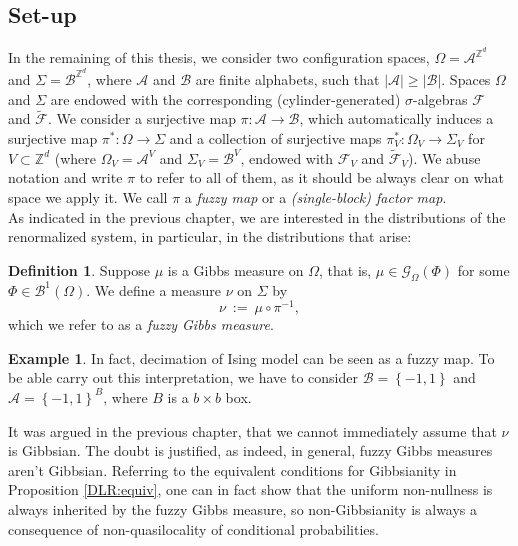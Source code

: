 \documentclass[12pt]{article}
\newcommand{\A}{\mathcal{A}}
\newcommand{\B}{\mathcal{B}}
\newcommand{\BB}{\mathscr{B}}
\newcommand{\F}{\mathcal{F}}
\newcommand{\G}{\mathcal{G}}
\newcommand{\Z}{\mathbb{Z}}
\newcommand{\set}[1]{\left\{#1\right\}}
\newcommand{\ra}{\rightarrow}
\newcommand{\1}{\mathbbm{1}}
\newcommand{\5}{\vspace{0.5cm}}
\renewcommand{\tilde}{\widetilde}
\theoremstyle{definition}
\newtheorem{ex}[thm]{Example}
\newtheorem{df}[thm]{Definition}
\begin{document}

\subsection{Set-up}

In the remaining of this thesis, we consider two configuration spaces, $\Omega=\A^{\Z^d}$ and $\Sigma=\B^{\Z^d}$, where $\A$ and $\B$ are finite alphabets, such that $|\A|\geq|\B|$. Spaces $\Omega$ and $\Sigma$ are endowed with the corresponding (cylinder-generated) $\sigma$-algebras $\F$ and $\tilde{\F}$. We consider a surjective map $\pi:\A\ra\B$, which automatically induces a surjective map $\pi^*:\Omega\ra\Sigma$ and a collection of surjective maps $\pi_V^*:\Omega_V\ra\Sigma_V$ for $V\subset\Z^d$ (where $\Omega_V=\A^V$ and $\Sigma_V=\B^V$, endowed with $\F_V$ and $\tilde{\F}_V$). We abuse notation and write $\pi$ to refer to all of them, as it should be always clear on what space we apply it. We call $\pi$ a \textit{fuzzy map} or a \textit{(single-block) factor map}.  \\

As indicated in the previous chapter, we are interested in the distributions of the renormalized system, in particular, in the distributions that arise:
\begin{df}
Suppose $\mu$ is a Gibbs measure on $\Omega$, that is, $\mu\in\G_\Omega(\Phi)$ for some $\Phi\in\BB^1(\Omega)$. We define a measure $\nu$ on $\Sigma$ by
$$\nu ~:=~ \mu \circ \pi^{-1},$$
which we refer to as a \textit{fuzzy Gibbs measure}.
\end{df}
\begin{ex}
In fact, decimation of Ising model can be seen as a fuzzy map. To be able carry out this interpretation, we have to consider $\B=\set{-1,1}$ and $\A=\set{-1,1}^{B}$, where $B$ is a $b\times b$ box.
\end{ex}
It was argued in the previous chapter, that we cannot immediately assume that $\nu$ is Gibbsian. The doubt is justified, as indeed, in general, fuzzy Gibbs measures aren't Gibbsian. Referring to the equivalent conditions for Gibbsianity in Proposition \ref{DLR:equiv}, one can in fact show that the uniform non-nullness is always inherited by the fuzzy Gibbs measure, so non-Gibbsianity is always a consequence of non-quasilocality of conditional probabilities. \\
\end{document}
